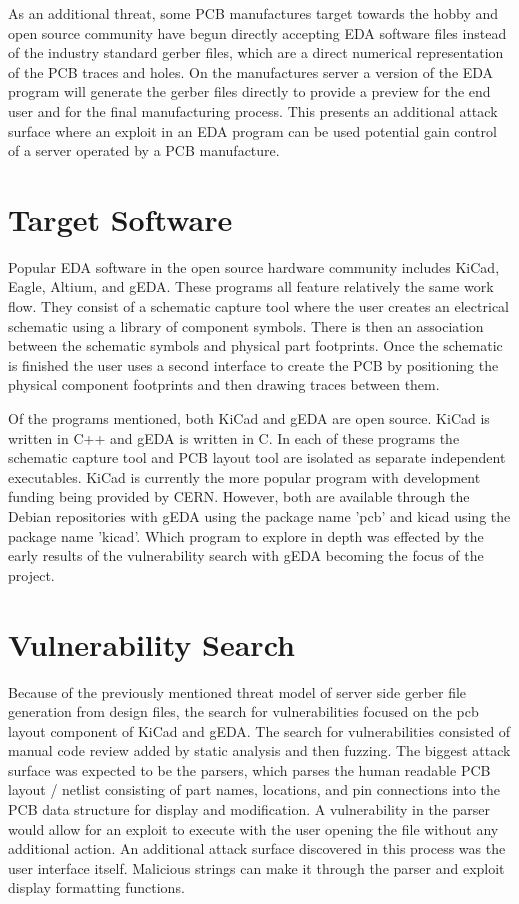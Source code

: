 \documentclass[12pt]{article}
\begin{document}
As an additional threat, some PCB manufactures target towards the hobby and open source community have begun directly accepting EDA software files instead of the industry standard gerber files, which are a direct numerical representation of the PCB traces and holes. On the manufactures server a version of the EDA program will generate the gerber files directly to provide a preview for the end user and for the final manufacturing process. This presents an additional attack surface where an exploit in an EDA program can be used potential gain control of a server operated by a PCB manufacture. 


\section{Target Software}
\label{S:3}
Popular EDA software in the open source hardware community includes KiCad, Eagle, Altium, and gEDA. These programs all feature relatively the same work flow. They consist of a schematic capture tool where the user creates an electrical schematic using a library of component symbols. There is then an association between the schematic symbols and physical part footprints. Once the schematic is finished the user uses a second interface to create the PCB by positioning the physical component footprints and then drawing traces between them. 

Of the programs mentioned, both KiCad and gEDA are open source. KiCad is written in C++ and gEDA is written in C. In each of these programs the schematic capture tool and PCB layout tool are isolated as separate independent executables. KiCad is currently the more popular program with development funding being provided by CERN. However, both are available through the Debian repositories with gEDA using the package name 'pcb' and kicad using the package name 'kicad'. Which program to explore in depth was effected by the early results of the vulnerability search with gEDA becoming the focus of the project. 


\section{Vulnerability Search}
\label{S:4}
Because of the previously mentioned threat model of server side gerber file generation from design files, the search for vulnerabilities focused on the pcb layout component of KiCad and gEDA. The search for vulnerabilities consisted of manual code review added by static analysis and then fuzzing. The biggest attack surface was expected to be the parsers, which parses the human readable PCB layout / netlist consisting of part names, locations, and pin connections into the PCB data structure for display and modification. A vulnerability in the parser would allow for an exploit to execute with the user opening the file without any additional action. An additional attack surface discovered in this process was the user interface itself. Malicious strings can make it through the parser and exploit display formatting functions. 
\end{document}

